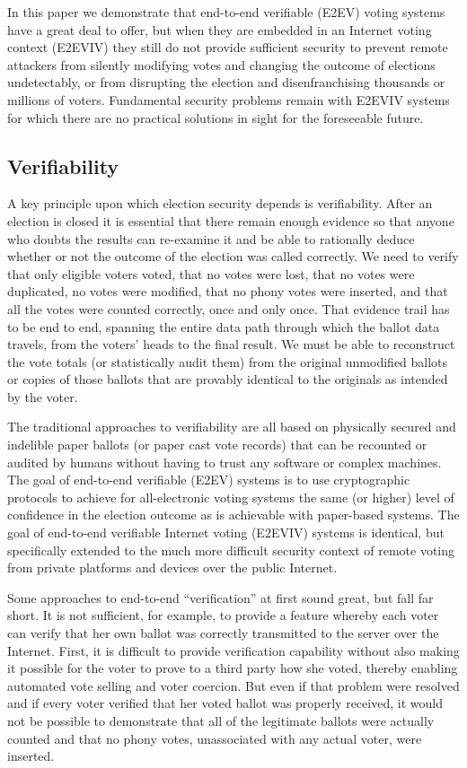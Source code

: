 In this paper we demonstrate that end-to-end verifiable (E2EV) voting
systems have a great deal to offer, but when they are embedded in an
Internet voting context (E2EVIV) they still do not provide sufficient
security to prevent remote attackers from silently modifying votes and
changing the outcome of elections undetectably, or from disrupting the
election and disenfranchising thousands or millions of
voters. Fundamental security problems remain with E2EVIV systems for
which there are no practical solutions in sight for the foreseeable
future.

\subsection{Verifiability}

A key principle upon which election security depends is
verifiability. After an election is closed it is essential that there
remain enough evidence so that anyone who doubts the results can
re-examine it and be able to rationally deduce whether or not the
outcome of the election was called correctly. We need to verify that
only eligible voters voted, that no votes were lost, that no votes
were duplicated, no votes were modified, that no phony votes were
inserted, and that all the votes were counted correctly, once and only
once. That evidence trail has to be end to end, spanning the entire
data path through which the ballot data travels, from the voters'
heads to the final result. We must be able to reconstruct the vote
totals (or statistically audit them) from the original unmodified
ballots or copies of those ballots that are provably identical to the
originals as intended by the voter.

The traditional approaches to verifiability are all based on
physically secured and indelible paper ballots (or paper cast vote
records) that can be recounted or audited by humans without having to
trust any software or complex machines. The goal of end-to-end
verifiable (E2EV) systems is to use cryptographic protocols to achieve
for all-electronic voting systems the same (or higher) level of
confidence in the election outcome as is achievable with paper-based
systems. The goal of end-to-end verifiable Internet voting (E2EVIV)
systems is identical, but specifically extended to the much more
difficult security context of remote voting from private platforms and
devices over the public Internet.

Some approaches to end-to-end ``verification'' at first sound great, but
fall far short. It is not sufficient, for example, to provide a
feature whereby each voter can verify that her own ballot was
correctly transmitted to the server over the Internet. First, it is
difficult to provide verification capability without also making it
possible for the voter to prove to a third party how she voted,
thereby enabling automated vote selling and voter coercion. But even
if that problem were resolved and if every voter verified that her
voted ballot was properly received, it would not be possible to
demonstrate that all of the legitimate ballots were actually counted
and that no phony votes, unassociated with any actual voter, were
inserted.

